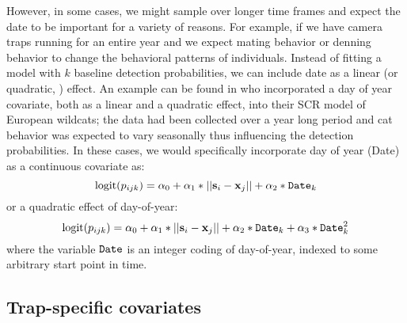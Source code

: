However, in some cases, we might sample over longer time frames and expect the date to be important for a
variety of reasons.  For example, if we have camera traps running for
an entire year and we expect mating behavior or denning behavior to
change the behavioral patterns of individuals. Instead of fitting a model with $k$ baseline detection probabilities, we can include date as a linear (or quadratic, \ldot) effect. An example can be found in 
\citet{kery_etal:2011} who incorporated a day of year covariate, both as a linear and a quadratic effect, into their
SCR model of European wildcats; the data had been collected over a year
long period and cat behavior was expected to vary seasonally thus
influencing the detection probabilities.  In these cases, we would
specifically incorporate day of year (Date) as a continuous covariate
as:
\[
\mbox{logit}(p_{ijk}) = \alpha_0 + \alpha_1*||{\bf s}_{i}-{\bf x}_{j}|| + \alpha_2*\mbox{\tt Date}_{k}
\]
or a quadratic effect of day-of-year:
\[
\mbox{logit}(p_{ijk}) = \alpha_0 + \alpha_1*||{\bf s}_{i}-{\bf x}_{j}|| +
\alpha_2*\mbox{\tt Date}_{k}
 + \alpha_3*\mbox{\tt Date}_{k}^{2}
\]
where the variable $\mbox{\tt Date}$ is an integer coding of
day-of-year, indexed to some arbitrary start point in time.

\subsection{Trap-specific covariates}


